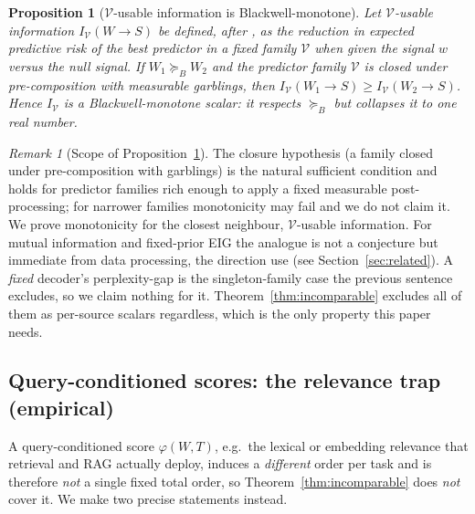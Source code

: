 \documentclass[11pt]{article}
\theoremstyle{plain}
\newtheorem{proposition}{Proposition}
\theoremstyle{definition}
\theoremstyle{remark}
\newtheorem{remark}{Remark}
\newcommand{\Vcal}{\mathcal{V}}
\newcommand{\Bord}{\succeq_{B}}
\begin{document}
\begin{proposition}[$\Vcal$-usable information is Blackwell-monotone]
\label{prop:vinfo-monotone}
Let $\Vcal$-usable information $I_{\Vcal}(W\!\to\! S)$ be defined, after
\citet{ethayarajh2022}, as the reduction in expected predictive risk of the best predictor
in a fixed family $\Vcal$ when given the signal $w$ versus the null signal. If $W_1 \Bord W_2$
and the predictor family $\Vcal$ is closed under pre-composition with measurable garblings, then
$I_{\Vcal}(W_1\!\to\! S) \ge I_{\Vcal}(W_2\!\to\! S)$. Hence $I_{\Vcal}$ is a Blackwell-monotone
scalar: it respects $\Bord$ but collapses it to one real number.
\end{proposition}

\begin{remark}[Scope of Proposition~\ref{prop:vinfo-monotone}]
\label{rem:vinfo-scope}
The closure hypothesis (a family closed under pre-composition with garblings) is the natural
sufficient condition and holds for predictor families rich enough to apply a fixed measurable
post-processing; for narrower families monotonicity may fail and we do not claim it. We prove
monotonicity for the closest neighbour, $\Vcal$-usable information. For mutual information and
fixed-prior EIG the analogue is not a conjecture but immediate from data processing, the direction
\citet{zheng2024pmi} use (see Section~\ref{sec:related}). A \emph{fixed} decoder's perplexity-gap is the
singleton-family case the previous sentence excludes, so we claim nothing for it.
Theorem~\ref{thm:incomparable} excludes all of them as per-source scalars regardless, which is the
only property this paper needs.
\end{remark}

\subsection{Query-conditioned scores: the relevance trap (empirical)}
\label{subsec:trap}

A query-conditioned score $\varphi(W,T)$, e.g.\ the lexical or embedding relevance that retrieval
and RAG actually deploy, induces a \emph{different} order per task and is therefore \emph{not} a
single fixed total order, so Theorem~\ref{thm:incomparable} does \emph{not} cover it. We make two
precise statements instead.
\end{document}
